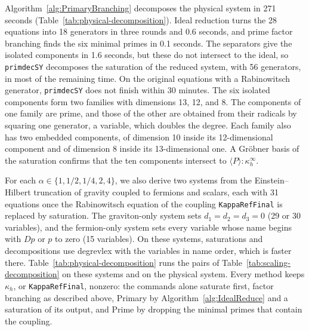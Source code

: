 Algorithm~\ref{alg:PrimaryBranching} decomposes the physical system in 271
seconds (Table~\ref{tab:physical-decomposition}). Ideal reduction turns the 28
equations into 18 generators in three rounds and 0.6 seconds, and prime factor
branching finds the six minimal primes in 0.1 seconds. The separators give the
isolated components in 1.6 seconds, but these do not intersect to the ideal,
so \texttt{primdecSY} decomposes the saturation of the reduced system, with 56
generators, in most of the remaining time. On the original equations with a
Rabinowitsch generator, \texttt{primdecSY} does not finish within 30 minutes.
The six isolated components form two families with dimensions 13, 12, and 8.
The components of one family are prime, and those of the other are obtained
from their radicals by squaring one generator, a variable, which doubles the
degree. Each family also has two embedded components, of dimension 10 inside
its 12-dimensional component and of dimension 8 inside its 13-dimensional
one. A Gr\"obner basis of the saturation confirms that the ten components
intersect to $\langle P\rangle:\kappa_h^\infty$.

For each $\alpha\in\{1,1/2,1/4,2,4\}$, we also derive two systems from the
Einstein--Hilbert truncation of gravity coupled to fermions and scalars, each
with 31 equations once the Rabinowitsch equation of the coupling
\texttt{KappaRefFinal} is replaced by saturation. The graviton-only system
sets $d_1=d_2=d_3=0$ (29 or 30 variables), and the fermion-only system sets
every variable whose name begins with $Dp$ or $p$ to zero (15 variables). On
these systems, saturations and decompositions use degrevlex with the variables
in name order, which is faster there. Table~\ref{tab:physical-decomposition}
runs the pairs of Table~\ref{tab:scaling-decomposition} on these systems and
on the physical system. Every method keeps $\kappa_h$, or
\texttt{KappaRefFinal}, nonzero: the commands alone saturate first, factor
branching as described above, Primary by Algorithm~\ref{alg:IdealReduce} and a
saturation of its output, and Prime by dropping the minimal primes that contain
the coupling.

